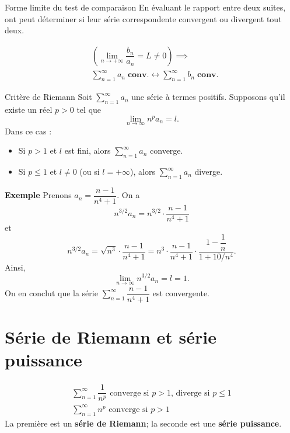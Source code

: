 \documentclass{report}
\begin{document}
\begin{multicols*}{3}
     \begin{theorem}{Forme limite du test de comparaison}{}
        En évaluant le rapport entre deux suites, ont peut déterminer si leur série correspondente 
        convergent ou divergent tout deux. 
        
        \begin{align*}
        &\left(\lim\limits_{n \to+\infty } \dfrac{b_n}{a_n}  = L \neq 0 \right) 
            \implies \\ &\sum_{n=1}^{\infty }a_n \; \textbf{conv.} 
        \leftrightarrow 
        \sum_{n=1}^{\infty }b_n \; \textbf{conv.}    
        \end{align*}
     \end{theorem}          




    \begin{theorem}{Critère de Riemann}
    Soit $\sum_{n=1}^{\infty} a_n$ une série à termes positifs. Supposons 
    qu'il existe un réel $p > 0$ tel que 
    \[
    \lim_{n \to \infty} n^p a_n = l.
    \]
    Dans ce cas :
    \begin{itemize}
      \item Si $p > 1$ et $l$ est fini, alors $\sum_{n=1}^{\infty} a_n$ 
      converge.
      \item Si $p \leq 1$ et $l \neq 0$ (ou si $l = +\infty$), alors 
      $\sum_{n=1}^{\infty} a_n$ diverge.
    \end{itemize}
    \end{theorem}
    \textbf{Exemple} Prenons $a_n = \dfrac{n-1}{n^4+1}$. On a
    \[
    n^{3/2} a_n = n^{3/2} \cdot \dfrac{n-1}{n^4+1}
    \]
    et
    \[
    n^{3/2} a_n = \sqrt{n^3} \cdot \dfrac{n-1}{n^4+1} = 
    n^3 \cdot \dfrac{n-1}{n^4+1} \cdot \dfrac{1-\dfrac{1}{n}}{1+10/n^4}.
    \]
    Ainsi, 
    \[
    \lim_{n \to \infty} n^{3/2} a_n = l = 1.
    \]
    On en conclut que la série $\sum_{n=1}^{\infty} \dfrac{n-1}{n^4+1}$ 
    est convergente.


    \section{Série de Riemann et série puissance} 
    \vspace{-1em}
    \begin{align*}
        \sum_{n=1}^{\infty }\dfrac{1}{n^p} 
        \text{ converge si } p > 1 \text{, diverge si } p \leq 1
        \\
        \sum_{n=1}^{\infty }n^p \text{ converge  si }
         p > 1 
    \end{align*}
    La première est un \textbf{série de Riemann}; la seconde 
    est une \textbf{série puissance}. 




\end{multicols*}
\end{document}
